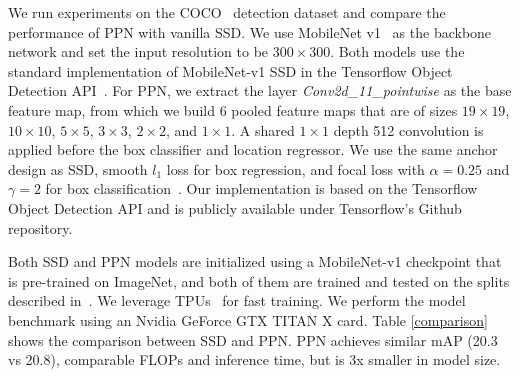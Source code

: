 \documentclass[10pt,twocolumn,letterpaper]{article}
\begin{document}
We run experiments on the COCO~\cite{lin2014coco} detection dataset
and compare the performance of PPN with vanilla SSD.
We use MobileNet v1~\cite{howard2017mobilenet} as the backbone network
and set the input resolution to be $300\times 300$.
Both models use the standard implementation of MobileNet-v1 SSD in
the Tensorflow Object Detection API~\cite{huang2017gmi}.
For PPN,
we extract the layer \textit{Conv2d\_11\_pointwise} as the base feature map,
from which we build 6 pooled feature maps that are of sizes
$19\times 19$,
$10\times 10$,
$5\times 5$,
$3\times 3$,
$2\times 2$, and
$1\times 1$.
A shared $1\times 1$ depth 512 convolution is applied before the box classifier and location regressor.
We use the same anchor design as SSD,
smooth $l_{1}$ loss for box regression,
and focal loss with $\alpha=0.25$ and $\gamma=2$ for box classification~\cite{lin2017focal}.
Our implementation is based on the Tensorflow Object Detection API
and is publicly available under Tensorflow's Github repository.

Both SSD and PPN models are initialized using a MobileNet-v1 checkpoint
that is pre-trained on ImageNet, and
both of them are trained and tested on the splits described in~\cite{huang2017gmi}.
We leverage TPUs~\cite{Jouppi2017tpu} for fast training.
We perform the model benchmark using an Nvidia GeForce GTX TITAN X card.
Table \ref{comparison} shows the comparison between SSD and PPN.
PPN achieves similar mAP (20.3 vs 20.8),
comparable FLOPs and inference time,
but is 3x smaller in model size.


{\small


}
\end{document}
